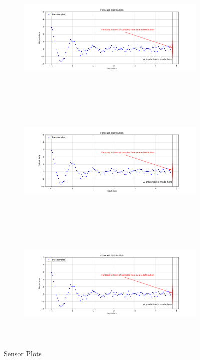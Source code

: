 \documentclass[12pt,a4paper,twoside]{scrartcl}
\numberwithin{equation}{section}
\begin{document}
\begin{figure}[H]
  \begin{subfigure}{0.32\textwidth}
    \includegraphics[width=\textwidth,height=6cm]{figures/forecast.png}%
    \label{fig:y equals x}
  \end{subfigure}
  \begin{subfigure}{0.32\textwidth}
    \includegraphics[width=\textwidth,height=6cm]{figures/forecast.png}%
    \label{fig:y equals x}
  \end{subfigure}
  \begin{subfigure}{0.32\textwidth}
    \includegraphics[width=\textwidth,height=6cm]{figures/forecast.png}%
    \label{fig:y equals x}
  \end{subfigure}      
    \caption{Sensor Plots}
  \end{figure}
\end{document}
